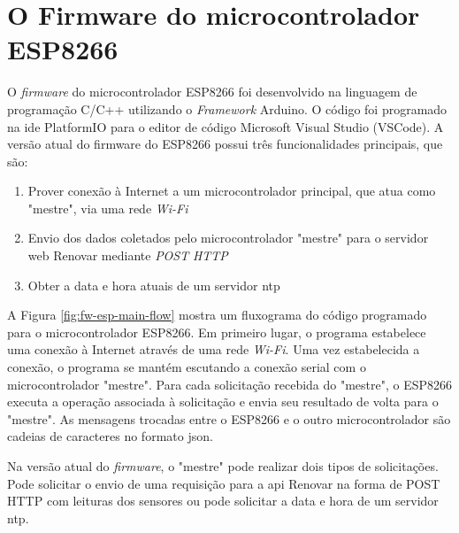 \chapter{O Firmware do microcontrolador ESP8266}\label{apendix:esp8266-fw}

O \textit{firmware} do microcontrolador ESP8266 foi desenvolvido na linguagem de programação C/C++ utilizando o \textit{Framework} Arduino. O código foi programado na \acrshort*{ide} PlatformIO para o editor de código Microsoft Visual Studio (VSCode). A versão atual do firmware do ESP8266 possui três funcionalidades principais, que são:

\begin{enumerate}
    \item Prover conexão à Internet a um microcontrolador principal, que atua como "mestre", via uma rede \textit{Wi-Fi}
    \item Envio dos dados coletados pelo microcontrolador "mestre" para o servidor web Renovar mediante \textit{POST} \textit{HTTP}
    \item Obter a data e hora atuais de um servidor \acrshort*{ntp}
\end{enumerate}

A Figura \ref{fig:fw-esp-main-flow} mostra um fluxograma do código programado para o microcontrolador ESP8266. Em primeiro lugar, o programa estabelece uma conexão à Internet através de uma rede \textit{Wi-Fi}. Uma vez estabelecida a conexão, o programa se mantém escutando a conexão serial com o microcontrolador "mestre". Para cada solicitação recebida do "mestre", o ESP8266 executa a operação associada à solicitação e envia seu resultado de volta para o "mestre". As mensagens trocadas entre o ESP8266 e o outro microcontrolador são cadeias de caracteres no formato \acrshort{json}.

Na versão atual do \textit{firmware}, o "mestre" pode realizar dois tipos de solicitações. Pode solicitar o envio de uma requisição para a \acrshort*{api} Renovar na forma de POST HTTP com leituras dos sensores ou pode solicitar a data e hora de um servidor \acrshort*{ntp}.

